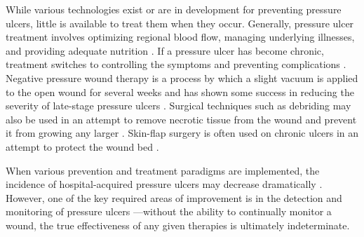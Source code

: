 			While various technologies exist or are in development for preventing pressure ulcers, little is available to treat them when they occur. Generally, pressure ulcer treatment involves optimizing regional blood flow, managing underlying illnesses, and providing adequate nutrition \cite{jaul10}. If a pressure ulcer has become chronic, treatment switches to controlling the symptoms and preventing complications \cite{jaul10}. Negative pressure wound therapy is a process by which a slight vacuum is applied to the open wound for several weeks and has shown some success in reducing the severity of late-stage pressure ulcers \cite{greer13}. Surgical techniques such as debriding may also be used in an attempt to remove necrotic tissue from the wound and prevent it from growing any larger \cite{longe86,brem02}. Skin-flap surgery is often used on chronic ulcers in an attempt to protect the wound bed \cite{biglari14}.

			When various prevention and treatment paradigms are implemented, the incidence of hospital-acquired pressure ulcers may decrease dramatically \cite{bales11,thompson11,carson11}. However, one of the key required areas of improvement is in the detection and monitoring of pressure ulcers \cite{milne09}---without the ability to continually monitor a wound, the true effectiveness of any given therapies is ultimately indeterminate.


